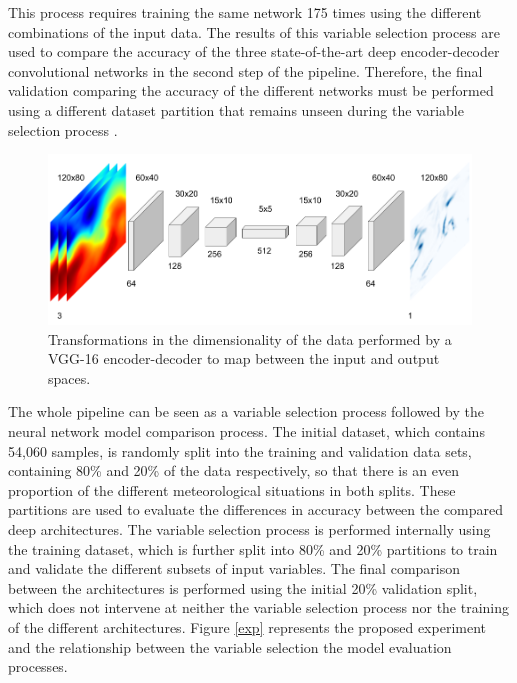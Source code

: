 \documentclass[twocol]{ametsoc}
\begin{document}
This process requires training the same network 175 times using the different combinations of the input data. The results of this variable selection process are used to compare the accuracy of the three state-of-the-art deep encoder-decoder convolutional networks in the second step of the pipeline. Therefore, the final validation comparing the accuracy of the different networks must be performed using a different dataset partition that remains unseen during the variable selection process  \citep{reunanen2003overfitting}.

\begin{figure}[h]
 \centerline{\includegraphics[width=13cm]{vgg16_enc.png}}
  \caption{Transformations in the dimensionality of the data performed by a VGG-16 encoder-decoder to map between the input and output spaces.}\label{vgg16}
\end{figure}

The whole pipeline can be seen as a variable selection process followed by the neural network model comparison process. The initial dataset, which contains 54,060 samples, is randomly split into the training and validation data sets, containing 80\% and 20\% of the data respectively, so that there is an even proportion of the different meteorological situations in both splits. These partitions are used to evaluate the differences in accuracy between the compared deep architectures. The variable selection process is performed internally using the training dataset, which is further split into 80\% and 20\% partitions to train and validate the different subsets of input variables. The final comparison between the architectures is performed using the initial 20\% validation split, which does not intervene at neither the variable selection process nor the training of the different architectures. Figure \ref{exp} represents the proposed experiment and the relationship between the variable selection the model evaluation processes. 
\end{document}
